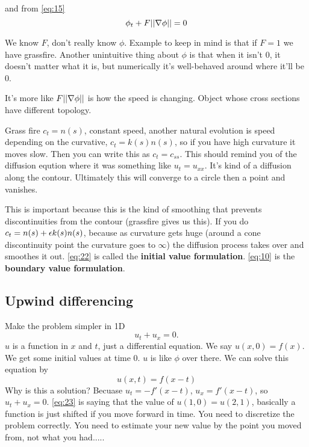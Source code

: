 and  from \eqref{eq:15}
\begin{equation}
  \label{eq:22}
\phi_t + F||\nabla \phi || =0  
\end{equation}

We know $F$, don't really know $\phi$. Example to keep in mind is that
if $F=1$ we have grassfire. 
Another unintuitive thing about $\phi$ is that when it isn't 0, it
doesn't matter what it is, but numerically it's well-behaved around
where it'll be 0.

It's more like $F||\nabla \phi ||$ is how the speed is changing. Object
whose cross sections have different topology.

Grass fire $c_t = n(s)$, constant speed, another natural evolution
is speed depending on the curvative, $c_t = k(s)n(s)$, so if you have high curvature
it moves slow. Then  you can write this as $c_t = c_{ss}$. This should
remind you of the diffusion eqution where it was something like $u_t =
u_{xx}$. It's kind of a diffusion along the contour. Ultimately this
will converge to a circle then a point and vanishes.

This is important because this is the kind of smoothing that prevents
discontinuities from the contour (grassfire gives us this). If you do
$c_t = n(s) +\epsilon k(s)n(s)$, because as curvature gets huge (around a
cone discontinuity point the curvature goes to $\infty$) the diffusion
process takes over and smoothes it out.  \eqref{eq:22} is called the
\textbf{initial value formulation}. \eqref{eq:10} is the \textbf{boundary
value formulation}.

\subsection{Upwind differencing}
\label{sec:upwind-differencing}
Make the problem simpler in 1D $$u_t + u_x = 0.$$ $u$ is a function in $x$ and
$t$, just a differential equation. We say $u(x,0) = f(x)$. We get some
initial values at time 0. $u$ is like $\phi$ over there. We can solve
this equation by
\begin{equation}
  \label{eq:23}
u(x,t) = f(x-t)  
\end{equation} Why is this a solution? Becuase
$u_t = -f'(x-t)$, $u_x = f'(x-t)$, so $u_t+u_x = 0$. \eqref{eq:23} is
saying that the
value of $u(1,0) = u(2,1)$, basically a function is just shifted if
you move forward in time. You need to discretize the problem
correctly. You need to estimate your new value by the point you moved
from, not what you had.....



\pagebreak

\pagebreak

\pagebreak

\pagebreak


